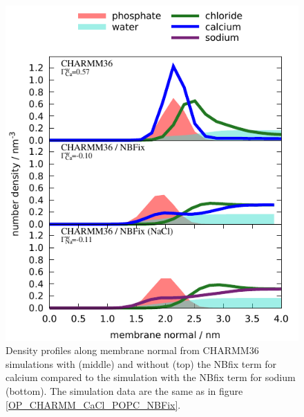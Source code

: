 \documentclass[journal=jpcbfk]{achemso}
\begin{document}
\begin{figure}[]
  \centering
  \includegraphics[width=17.0cm]{../Figs/density_profile_CHARMM_CaCl_POPC_NBFix.pdf}
  \caption{\label{density_profile_CHARMM_CaCl_POPC_NBFix}
    Density profiles along membrane normal from CHARMM36 simulations with (middle)
    and without (top) the NBfix term for calcium \cite{kim16} compared to the simulation
    with the NBfix term for sodium \cite{venable13} (bottom). The simulation data are the same as in figure \ref{OP_CHARMM_CaCl_POPC_NBFix}.
  }
\end{figure}

\pagebreak
\end{document}
